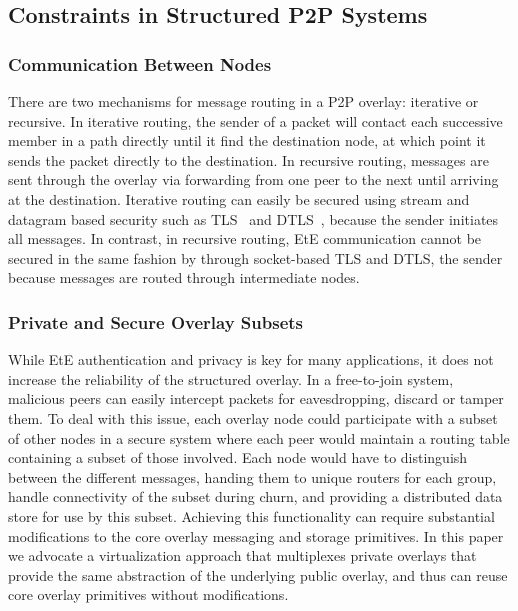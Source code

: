 \documentclass[conference]{IEEEtran}
\begin{document}
\subsection{Constraints in Structured P2P Systems}
\subsubsection{Communication Between Nodes}
There are two mechanisms for message routing in a P2P overlay: iterative or
recursive.  In iterative routing, the sender of a packet will contact each
successive member in a path directly until it find the destination node, at
which point it sends the packet directly to the destination.  In recursive
routing, messages are sent through the overlay via forwarding from one peer to
the next until arriving at the destination.  Iterative routing can easily be
secured using stream and datagram based security such as TLS~\cite{tls} and
DTLS~\cite{dtls}, because the sender initiates all messages.  In contrast, in
recursive routing, EtE communication cannot be secured in the same fashion by
through socket-based TLS and DTLS, the sender because messages are routed
through intermediate nodes.

\subsubsection{Private and Secure Overlay Subsets}
While EtE authentication and privacy is key for many applications, it does not increase the reliability of the structured
overlay.  In a free-to-join system, malicious peers can easily intercept packets
for eavesdropping, discard or tamper them.  To deal with
this issue, each overlay node could participate with a subset of other nodes in
a secure system where each peer would maintain a routing table containing a subset
of those involved.  Each node would have to distinguish between the different
messages, handing them to unique routers for each group, handle connectivity
of the subset during churn, and providing a distributed data store for use by this subset.
Achieving this functionality can require substantial modifications to the core overlay
messaging and storage primitives. In this paper we advocate a virtualization approach
that multiplexes private overlays that provide the same abstraction of the underlying
public overlay, and thus can reuse core overlay primitives without modifications.
\end{document}
